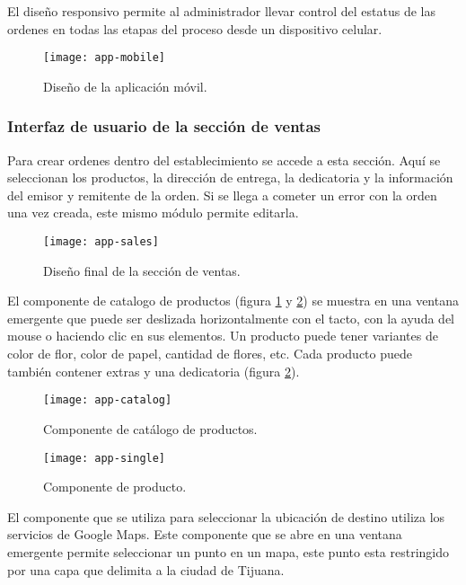 El diseño responsivo permite al administrador llevar control del estatus de las ordenes en todas las etapas del proceso desde un dispositivo celular.
\vspace{0.8cm}

\begin{figure}[H]
  \centering
  \texttt{[image: app-mobile]}
  \caption{Diseño de la aplicación móvil.}
\end{figure}
\vspace{0.8cm}

\subsubsection{Interfaz de usuario de la sección de ventas}
Para crear ordenes dentro del establecimiento se accede a esta sección. Aquí se seleccionan los productos, la dirección de entrega, la dedicatoria y la información del emisor y remitente de la orden. Si se llega a cometer un error con la orden una vez creada, este mismo módulo permite editarla.
\vspace{0.8cm}

\begin{figure}[H]
  \centering
  \texttt{[image: app-sales]}
  \caption{Diseño final de la sección de ventas.}
\end{figure}

El componente de catalogo de productos (figura \ref{catalog} y \ref{single-product}) se muestra en una ventana emergente que puede ser deslizada horizontalmente con el tacto, con la ayuda del mouse o haciendo clic en sus elementos. Un producto puede tener variantes de color de flor, color de papel, cantidad de flores, etc. Cada producto puede también contener extras y una dedicatoria (figura \ref{single-product}).

\begin{figure}[H]
  \centering
  \texttt{[image: app-catalog]}
  \caption{Componente de catálogo de productos.}
  \label{catalog}
\end{figure}

\begin{figure}[H]
  \centering
  \texttt{[image: app-single]}
  \caption{Componente de producto.}
  \label{single-product}
\end{figure}

El componente que se utiliza para seleccionar la ubicación de destino utiliza los servicios de Google Maps. Este componente que se abre en una ventana emergente permite seleccionar un punto en un mapa, este punto esta restringido por una capa que delimita a la ciudad de Tijuana.
\vspace{0.8cm}

